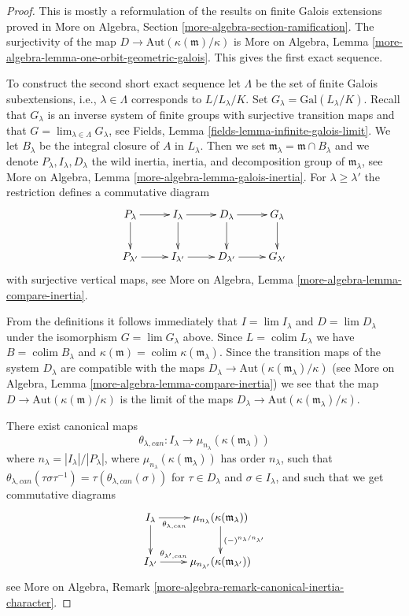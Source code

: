 \documentclass{stacks-project}
\theoremstyle{plain}
\theoremstyle{definition}
\theoremstyle{remark}
\numberwithin{equation}{subsection}
\def\lim{\mathop{\mathrm{lim}}\nolimits}
\def\colim{\mathop{\mathrm{colim}}\nolimits}
\begin{document}
\begin{proof}
This is mostly a reformulation of the results on finite Galois extensions
proved in More on Algebra, Section \ref{more-algebra-section-ramification}.
The surjectivity of the map $D \to \text{Aut}(\kappa(\mathfrak m)/\kappa)$ is
More on Algebra, Lemma \ref{more-algebra-lemma-one-orbit-geometric-galois}.
This gives the first exact sequence.

\medskip\noindent
To construct the second short exact sequence let $\Lambda$ be the set
of finite Galois subextensions, i.e., $\lambda \in \Lambda$ corresponds
to $L/L_\lambda/K$. Set $G_\lambda = \text{Gal}(L_\lambda/K)$.
Recall that $G_\lambda$ is an inverse system of finite groups with surjective
transition maps and that $G = \lim_{\lambda \in \Lambda} G_\lambda$, see
Fields, Lemma \ref{fields-lemma-infinite-galois-limit}.
We let $B_\lambda$ be the integral closure of $A$ in $L_\lambda$.
Then we set $\mathfrak m_\lambda = \mathfrak m \cap B_\lambda$
and we denote $P_\lambda, I_\lambda, D_\lambda$ the
wild inertia, inertia, and decomposition group of
$\mathfrak m_\lambda$, see More on Algebra, Lemma
\ref{more-algebra-lemma-galois-inertia}.
For $\lambda \geq \lambda'$ the restriction defines
a commutative diagram
$$
\xymatrix{
P_\lambda \ar[d] \ar[r] &
I_\lambda \ar[d] \ar[r] &
D_\lambda \ar[d] \ar[r] &
G_\lambda \ar[d] \\
P_{\lambda'} \ar[r] &
I_{\lambda'} \ar[r] &
D_{\lambda'} \ar[r] &
G_{\lambda'}
}
$$
with surjective vertical maps, see
More on Algebra, Lemma \ref{more-algebra-lemma-compare-inertia}.

\medskip\noindent
From the definitions it follows immediately
that $I = \lim I_\lambda$ and $D = \lim D_\lambda$
under the isomorphism $G = \lim G_\lambda$ above.
Since $L = \colim L_\lambda$ we have $B = \colim B_\lambda$
and $\kappa(\mathfrak m) = \colim \kappa(\mathfrak m_\lambda)$.
Since the transition maps of the system $D_\lambda$
are compatible with the maps
$D_\lambda \to \text{Aut}(\kappa(\mathfrak m_\lambda)/\kappa)$
(see More on Algebra, Lemma \ref{more-algebra-lemma-compare-inertia})
we see that the map $D \to \text{Aut}(\kappa(\mathfrak m)/\kappa)$
is the limit of the maps
$D_\lambda \to \text{Aut}(\kappa(\mathfrak m_\lambda)/\kappa)$.

\medskip\noindent
There exist canonical maps
$$
\theta_{\lambda, can} :
I_\lambda
\longrightarrow
\mu_{n_\lambda}(\kappa(\mathfrak m_\lambda))
$$
where $n_\lambda = |I_\lambda|/|P_\lambda|$, where
$\mu_{n_\lambda}(\kappa(\mathfrak m_\lambda))$ has
order $n_\lambda$, such that
$\theta_{\lambda, can}(\tau \sigma \tau^{-1}) =
\tau(\theta_{\lambda, can}(\sigma))$ for
$\tau \in D_\lambda$ and $\sigma \in I_\lambda$, and such that
we get commutative diagrams
$$
\xymatrix{
I_\lambda \ar[r]_-{\theta_{\lambda, can}} \ar[d] &
\mu_{n_\lambda}(\kappa(\mathfrak m_\lambda))
\ar[d]^{(-)^{n_\lambda/n_{\lambda'}}} \\
I_{\lambda'} \ar[r]^-{\theta_{\lambda', can}} &
\mu_{n_{\lambda'}}(\kappa(\mathfrak m_{\lambda'}))
}
$$
see
More on Algebra, Remark \ref{more-algebra-remark-canonical-inertia-character}.


\end{proof}
\end{document}
